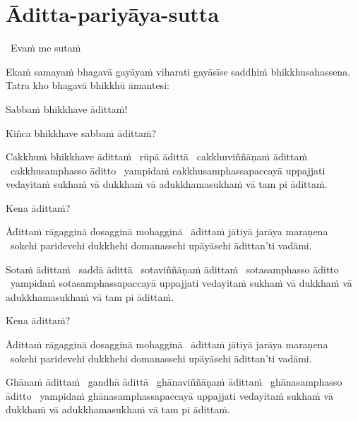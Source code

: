 \section{Āditta-pariyāya-sutta}
\label{aditta-pariyaya}

\begin{leader}
  \anglebracketleft\ \hspace{-0.5mm}Evaṁ me sutaṁ \hspace{-0.5mm}\anglebracketright\
\end{leader}

\begin{pali-hang}
  Ekaṁ samayaṁ bhagavā gayāyaṁ viharati gayāsīse saddhiṁ bhikkhusahassena. Tatra kho bhagavā bhikkhū āmantesi:
\end{pali-hang}

Sabbaṁ bhikkhave ādittaṁ!

Kiñca bhikkhave sabbaṁ ādittaṁ?

\begin{pali-hang}
  Cakkhuṁ bhikkhave ādittaṁ \breathmark\ rūpā ādittā \breathmark\ cakkhuviññāṇaṁ ādittaṁ \breathmark\ cakkhusamphasso āditto \breathmark\ yampidaṁ cakkhusamphassapaccayā uppajjati vedayitaṁ sukhaṁ vā dukkhaṁ vā adukkhamasukhaṁ vā tam pi ādittaṁ.
\end{pali-hang}

Kena ādittaṁ?

\begin{pali-hang}
  Ādittaṁ rāgagginā dosagginā mohagginā \breathmark\ ādittaṁ jātiyā jarāya maraṇena \breathmark\ sokehi paridevehi dukkhehi domanassehi upāyāsehi ādittan'ti vadāmi.
\end{pali-hang}

\begin{pali-hang}
  Sotaṁ ādittaṁ \breathmark\ saddā ādittā \breathmark\ sotaviññāṇaṁ ādittaṁ \breathmark\ sotasamphasso āditto \breathmark\ yampidaṁ sotasamphassapaccayā uppajjati vedayitaṁ sukhaṁ vā dukkhaṁ vā adukkhamasukhaṁ vā tam pi ādittaṁ.
\end{pali-hang}

Kena ādittaṁ?

\begin{pali-hang}
  Ādittaṁ rāgagginā dosagginā mohagginā \breathmark\ ādittaṁ jātiyā jarāya maraṇena \breathmark\ sokehi paridevehi dukkhehi domanassehi upāyāsehi ādittan'ti vadāmi.
\end{pali-hang}

\begin{pali-hang}
  Ghānaṁ ādittaṁ \breathmark\ gandhā ādittā \breathmark\ ghānaviññāṇaṁ ādittaṁ \breathmark\ ghānasamphasso āditto \breathmark\ yampidaṁ ghānasamphassapaccayā uppajjati vedayitaṁ sukhaṁ vā dukkhaṁ vā adukkhamasukhaṁ vā tam pi ādittaṁ.
\end{pali-hang}

